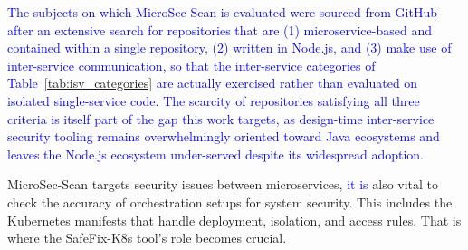 \documentclass[preprint,12pt]{elsarticle}
\newcommand{\new}[1]{\textcolor{blue}{#1}}
\begin{document}
\new{The subjects on which MicroSec-Scan is evaluated were sourced from
GitHub after an extensive search for repositories that are (1)
microservice-based and contained within a single repository, (2) written in
Node.js, and (3) make use of inter-service communication, so that the
inter-service categories of Table~\ref{tab:isv_categories} are actually
exercised rather than evaluated on isolated single-service code. The
scarcity of repositories satisfying all three criteria is itself part of
the gap this work targets, as design-time inter-service security tooling
remains overwhelmingly oriented toward Java ecosystems and leaves the
Node.js ecosystem under-served despite its widespread adoption.}

MicroSec-Scan targets security issues between microservices, \new{it is} also vital to check the accuracy of orchestration setups for system security. This includes the Kubernetes manifests that handle deployment, isolation, and access rules. That is where the SafeFix-K8s tool's role becomes crucial. 
\end{document}
